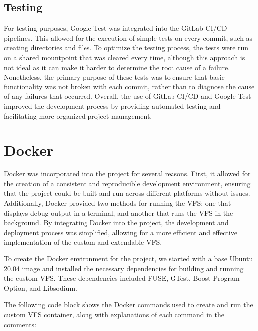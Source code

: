 \subsection{Testing}\label{subsec:testing}

For testing purposes, Google Test was integrated into the GitLab CI/CD pipelines.
This allowed for the execution of simple tests on every commit, such as creating directories and files.
To optimize the testing process, the tests were run on a shared mountpoint that was cleared every time, although this approach is not ideal as it can make it harder to determine the root cause of a failure.
Nonetheless, the primary purpose of these tests was to ensure that basic functionality was not broken with each commit, rather than to diagnose the cause of any failures that occurred.
Overall, the use of GitLab CI/CD and Google Test improved the development process by providing automated testing and facilitating more organized project management.

\section{Docker}\label{sec:docker}

Docker\cite{docker} was incorporated into the project for several reasons.
First, it allowed for the creation of a consistent and reproducible development environment, ensuring that the project could be built and run across different platforms without issues.
Additionally, Docker provided two methods for running the VFS: one that displays debug output in a terminal, and another that runs the VFS in the background.
By integrating Docker into the project, the development and deployment process was simplified, allowing for a more efficient and effective implementation of the custom and extendable VFS.

To create the Docker environment for the project, we started with a base Ubuntu 20.04 image and installed the necessary dependencies for building and running the custom VFS\@.
These dependencies included FUSE, GTest, Boost Program Option, and Libsodium.

The following code block shows the Docker commands used to create and run the custom VFS container, along with explanations of each command in the comments:


